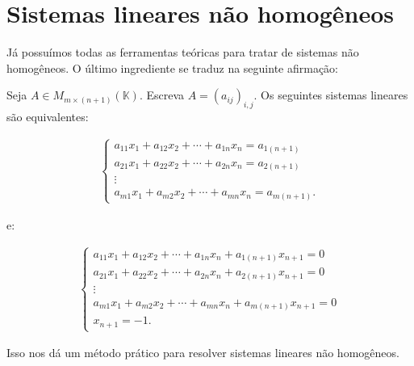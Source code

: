 \section{Sistemas lineares não homogêneos}

Já possuímos todas as ferramentas teóricas para tratar de sistemas não homogêneos.
O último ingrediente se traduz na seguinte afirmação:

\begin{lemma}
Seja $A\in M_{m\times (n+1)}(\mathbb K)$.
Escreva $A=(a_{ij})_{i, j}$.
Os seguintes sistemas lineares são equivalentes:

\begin{align*}
        \begin{cases}
            a_{11}x_1 + a_{12}x_2 + \cdots + a_{1n}x_n = a_{1(n+1)} \\
            a_{21}x_1 + a_{22}x_2 + \cdots + a_{2n}x_n = a_{2(n+1)} \\
            \vdots \\
            a_{m1}x_1 + a_{m2}x_2 + \cdots + a_{mn}x_n = a_{m(n+1)}.
        \end{cases}
\end{align*}

e:

\begin{align*}
        \begin{cases}
            a_{11}x_1 + a_{12}x_2 + \cdots + a_{1n}x_n +a_{1(n+1)}x_{n+1}=0 \\
            a_{21}x_1 + a_{22}x_2 + \cdots + a_{2n}x_n +a_{2(n+1)}x_{n+1}=0 \\
            \vdots \\
            a_{m1}x_1 + a_{m2}x_2 + \cdots + a_{mn}x_n +a_{m(n+1)}x_{n+1}=0 \\
            x_{n+1}=-1.
        \end{cases}
\end{align*}
\end{lemma}

Isso nos dá um método prático para resolver sistemas lineares não homogêneos.

